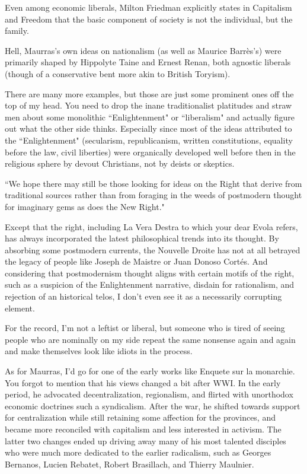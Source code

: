 \begin{footnotesize}
\begin{sffamily}
Even among economic liberals, Milton Friedman explicitly states in Capitalism and Freedom that the basic component of society is not the individual, but the family.

Hell, Maurras's own ideas on nationalism (as well as Maurice Barrès's) were primarily shaped by Hippolyte Taine and Ernest Renan, both agnostic liberals (though of a conservative bent more akin to British Toryism). 

There are many more examples, but those are just some prominent ones off the top of my head. You need to drop the inane traditionalist platitudes and straw men about some monolithic ``Enlightenment" or ``liberalism" and actually figure out what the other side thinks. Especially since most of the ideas attributed to the ``Enlightenment" (secularism, republicanism, written constitutions, equality before the law, civil liberties) were organically developed well before then in the religious sphere by devout Christians, not by deists or skeptics.

``We hope there may still be those looking for ideas on the Right that derive from traditional sources rather than from foraging in the weeds of postmodern thought for imaginary gems as does the New Right."

Except that the right, including La Vera Destra to which your dear Evola refers, has always incorporated the latest philosophical trends into its thought. By absorbing some postmodern currents, the Nouvelle Droite has not at all betrayed the legacy of people like Joseph de Maistre or Juan Donoso Cortés. And considering that postmodernism thought aligns with certain motifs of the right, such as a suspicion of the Enlightenment narrative, disdain for rationalism, and rejection of an historical telos, I don't even see it as a necessarily corrupting element.

For the record, I'm not a leftist or liberal, but someone who is tired of seeing people who are nominally on my side repeat the same nonsense again and again and make themselves look like idiots in the process. 

As for Maurras, I'd go for one of the early works like Enquete sur la monarchie. You forgot to mention that his views changed a bit after WWI. In the early period, he advocated decentralization, regionalism, and flirted with unorthodox economic doctrines such a syndicalism. After the war, he shifted towards support for centralization while still retaining some affection for the provinces, and became more reconciled with capitalism and less interested in activism. The latter two changes ended up driving away many of his most talented disciples who were much more dedicated to the earlier radicalism, such as Georges Bernanos, Lucien Rebatet, Robert Brasillach, and Thierry Maulnier.



\end{sffamily}
\end{footnotesize}
